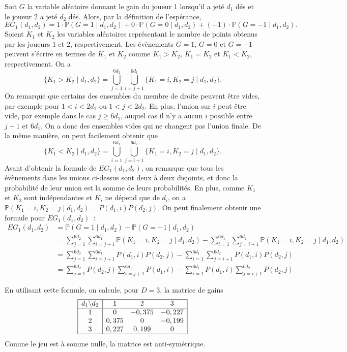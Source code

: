 \documentclass[a4paper,11pt]{amsart}
\theoremstyle{plain}
\begin{document}
Soit $G$ la variable aléatoire donnant le gain du joueur 1 lorsqu'il a jeté $d_1$ dés et le joueur 2 a jeté $d_2$ dés. Alors, par la définition de l'espérance,
\[
EG_1(d_1, d_2) = 1 \cdot \mathbb P(G = 1 \mid d_1, d_2) + 0 \cdot \mathbb P(G = 0 \mid d_1, d_2) + (-1) \cdot \mathbb P(G = -1 \mid d_1, d_2).
\]
Soient $K_1$ et $K_2$ les variables aléatoires représentant le nombre de points obtenus par les joueurs 1 et 2, respectivement. Les évènements $G = 1$, $G = 0$ et $G = -1$ peuvent s'écrire en termes de $K_1$ et $K_2$ comme $K_1 > K_2$, $K_1 = K_2$ et $K_1 < K_2$, respectivement. On a
\[
\{K_1 > K_2 \mid d_1, d_2\} = \bigcup_{j=1}^{6 d_2} \bigcup_{i = j+1}^{6 d_1} \{K_1 = i, K_2 = j \mid d_1, d_2\}.
\]
On remarque que certains des ensembles du membre de droite peuvent être vides, par exemple pour $1 < i < 2 d_1$ ou $1 < j < 2 d_2$. En plus, l'union sur $i$ peut être vide, par exemple dans le cas $j \geq 6 d_1$, auquel cas il n'y a aucun $i$ possible entre $j+1$ et $6 d_1$. On a donc des ensembles vides qui ne changent pas l'union finale. De la même manière, on peut facilement obtenir que
\[
\{K_1 < K_2 \mid d_1, d_2\} = \bigcup_{i=1}^{6 d_1} \bigcup_{j = i+1}^{6 d_2} \{K_1 = i, K_2 = j \mid d_1, d_2\}.
\]
Avant d'obtenir la formule de $EG_1(d_1, d_2)$, on remarque que tous les évènements dans les unions ci-dessus sont deux à deux disjoints, et donc la probabilité de leur union est la somme de leurs probabilités. En plus, comme $K_1$ et $K_2$ sont indépendantes et $K_i$ ne dépend que de $d_i$, on a $\mathbb P(K_1 = i, K_2 = j \mid d_1, d_2) = P(d_1, i) P(d_2, j)$. On peut finalement obtenir une formule pour $EG_1(d_1, d_2)$~:
\begin{align*}
EG_1(d_1, d_2) & = \mathbb P(G = 1 \mid d_1, d_2) - \mathbb P(G = -1 \mid d_1, d_2) \\
& = \sum_{j=1}^{6 d_2} \sum_{i = j+1}^{6 d_1} \mathbb P(K_1 = i, K_2 = j \mid d_1, d_2) - \sum_{i=1}^{6 d_1} \sum_{j = i+1}^{6 d_2} \mathbb P(K_1 = i, K_2 = j \mid d_1, d_2) \\
& = \sum_{j=1}^{6 d_2} \sum_{i = j+1}^{6 d_1} P(d_1, i) P(d_2, j) - \sum_{i=1}^{6 d_1} \sum_{j = i+1}^{6 d_2} P(d_1, i) P(d_2, j) \\
& = \sum_{j=1}^{6 d_2} P(d_2, j) \sum_{i = j+1}^{6 d_1} P(d_1, i) - \sum_{i=1}^{6 d_1} P(d_1, i) \sum_{j = i+1}^{6 d_2} P(d_2, j)
\end{align*}

En utilisant cette formule, on calcule, pour $D = 3$, la matrice de gains
\[
\begin{array}{|c|ccc|}
\hline
d_1 \backslash d_2 & 1 & 2 & 3 \\
\hline
1 & 0     & -0,375 & -0,227 \\
2 & 0,375 &  0     & -0,199 \\
3 & 0,227 &  0,199 &  0 \\
\hline
\end{array}
\]
Comme le jeu est à somme nulle, la matrice est anti-symétrique.
\end{document}
